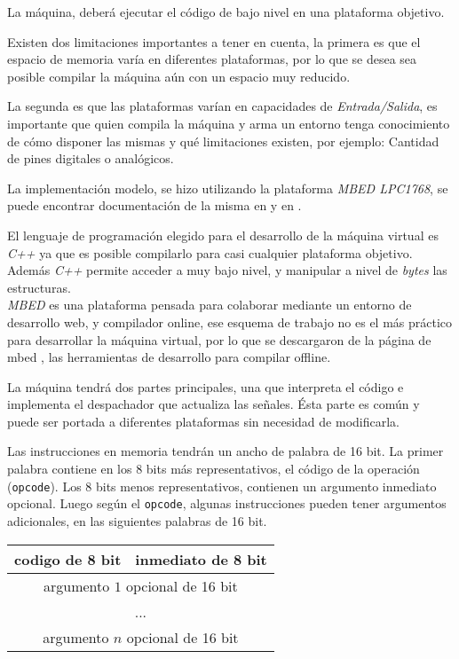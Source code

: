  La máquina, deberá ejecutar el código de bajo nivel en una plataforma
  objetivo.

  Existen dos limitaciones importantes a tener en cuenta, la primera es que
el espacio de memoria varía en diferentes plataformas, por lo que se desea
sea posible compilar la máquina aún con un espacio muy reducido.

  La segunda es que las plataformas varían en capacidades
de \textit{Entrada/Salida}, es importante que quien compila la máquina y
arma un entorno tenga conocimiento de cómo disponer las mismas y qué
limitaciones existen, por ejemplo: Cantidad de pines digitales o analógicos.

  La implementación modelo, se hizo utilizando
  la plataforma \textit{MBED LPC1768},
se puede encontrar documentación de la misma en \cite{mbed-LPC1768} 
y en \cite{mbed}.

  El lenguaje de programación elegido para el desarrollo de la máquina virtual
es \textit{C++} ya que es posible compilarlo para casi cualquier plataforma
objetivo.
  Además \textit{C++} permite acceder a muy bajo nivel, y manipular a
nivel de \emph{bytes} las estructuras.\\

  \textit{MBED} es una plataforma pensada para colaborar mediante
un entorno de desarrollo web, y compilador online, ese esquema de 
trabajo no es el más práctico para desarrollar la máquina virtual, por
lo que se descargaron de la página de mbed \cite{mbeddev}, las herramientas
de desarrollo para compilar offline.

  La máquina tendrá dos partes principales, una que interpreta el código e
  implementa el despachador que actualiza las señales.
  Ésta parte es común y puede ser portada a diferentes plataformas sin
  necesidad de modificarla.

  Las instrucciones en memoria tendrán un ancho de palabra de 16 bit.
  La primer palabra contiene en los 8 bits más representativos, el código
  de la operación (\texttt{opcode}).
  Los 8 bits menos representativos, contienen un argumento inmediato
  opcional.
  Luego según el \texttt{opcode}, algunas instrucciones pueden tener
  argumentos adicionales, en las siguientes palabras de 16 bit.

  \begin{center}
      \begin{tabular}{|c|c|}
      \hline
      codigo de 8 bit & \cellcolor{gray!25}inmediato de 8 bit \\
      \hline
      \multicolumn{2}{|c|}{argumento $1$ opcional de 16 bit} \\
      \hline
      \multicolumn{2}{|c|}{...} \\
      \hline
      \multicolumn{2}{|c|}{argumento $n$ opcional de 16 bit} \\
      \hline
      \end{tabular}
  \end{center}

